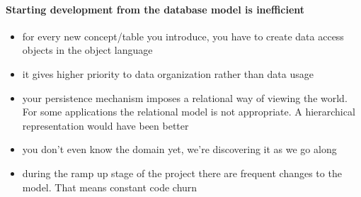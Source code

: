 \documentclass{article}
\begin{document}
\paragraph{Starting development from the database model is inefficient}
\begin{itemize} 
\item for every new concept/table you introduce, you have to create
  data access objects in the object language

\item it gives higher priority to data organization rather than data
  usage
\item your persistence mechanism imposes a relational way of viewing
  the world. For some applications the relational model is not
  appropriate. A hierarchical representation would have been better

\item you don't even know the domain yet, we're discovering it as we
  go along
\item during the ramp up stage of the project there are frequent
  changes to the model. That means constant code churn
\end{itemize}
\end{document}
